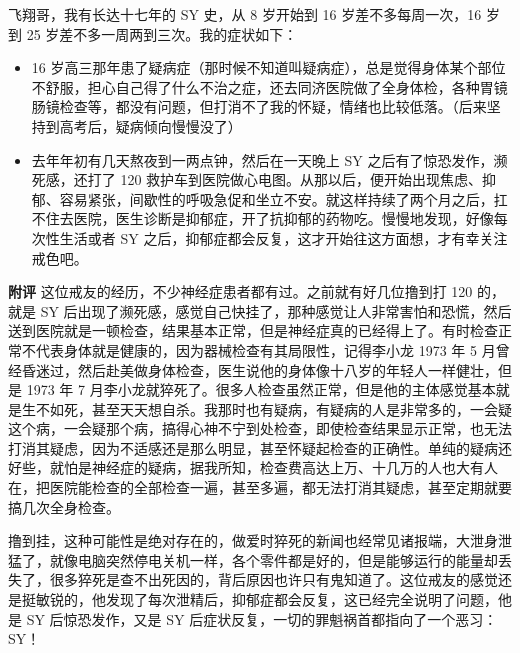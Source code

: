 \begin{case}
    飞翔哥，我有长达十七年的 SY 史，从 8 岁开始到 16 岁差不多每周一次，16 岁到 25 岁差不多一周两到三次。我的症状如下：\begin{itemize}
        \item 16 岁高三那年患了疑病症（那时候不知道叫疑病症），总是觉得身体某个部位不舒服，担心自己得了什么不治之症，还去同济医院做了全身体检，各种胃镜肠镜检查等，都没有问题，但打消不了我的怀疑，情绪也比较低落。（后来坚持到高考后，疑病倾向慢慢没了）
        \item 去年年初有几天熬夜到一两点钟，然后在一天晚上 SY 之后有了惊恐发作，濒死感，还打了 120 救护车到医院做心电图。从那以后，便开始出现焦虑、抑郁、容易紧张，间歇性的呼吸急促和坐立不安。就这样持续了两个月之后，扛不住去医院，医生诊断是抑郁症，开了抗抑郁的药物吃。慢慢地发现，好像每次性生活或者 SY 之后，抑郁症都会反复，这才开始往这方面想，才有幸关注戒色吧。
    \end{itemize}

    \textbf{附评} 这位戒友的经历，不少神经症患者都有过。之前就有好几位撸到打 120 的，就是 SY 后出现了濒死感，感觉自己快挂了，那种感觉让人非常害怕和恐慌，然后送到医院就是一顿检查，结果基本正常，但是神经症真的已经得上了。有时检查正常不代表身体就是健康的，因为器械检查有其局限性，记得李小龙 1973 年 5 月曾经昏迷过，然后赴美做身体检查，医生说他的身体像十八岁的年轻人一样健壮，但是 1973 年 7 月李小龙就猝死了。很多人检查虽然正常，但是他的主体感觉基本就是生不如死，甚至天天想自杀。我那时也有疑病，有疑病的人是非常多的，一会疑这个病，一会疑那个病，搞得心神不宁到处检查，即使检查结果显示正常，也无法打消其疑虑，因为不适感还是那么明显，甚至怀疑起检查的正确性。单纯的疑病还好些，就怕是神经症的疑病，据我所知，检查费高达上万、十几万的人也大有人在，把医院能检查的全部检查一遍，甚至多遍，都无法打消其疑虑，甚至定期就要搞几次全身检查。

    撸到挂，这种可能性是绝对存在的，做爱时猝死的新闻也经常见诸报端，大泄身泄猛了，就像电脑突然停电关机一样，各个零件都是好的，但是能够运行的能量却丢失了，很多猝死是查不出死因的，背后原因也许只有鬼知道了。这位戒友的感觉还是挺敏锐的，他发现了每次泄精后，抑郁症都会反复，这已经完全说明了问题，他是 SY 后惊恐发作，又是 SY 后症状反复，一切的罪魁祸首都指向了一个恶习：SY！
\end{case}

